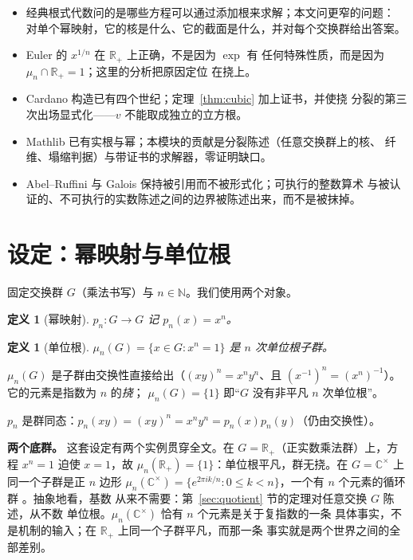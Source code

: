 \documentclass[submission,noinfoline]{jsfds}
\newtheorem{definition}[theorem]{定义}
\begin{document}
\begin{itemize}
\item 经典根式代数问的是哪些方程可以通过添加根来求解；本文问更窄的问题：
对单个幂映射，它的核是什么、它的截面是什么，并对每个交换群给出答案。
\item Euler 的 $x^{1/n}$ 在 $\mathbb R_+$ 上正确，不是因为 $\exp$ 有
任何特殊性质，而是因为 $\mu_n\cap\mathbb R_+=1$；这里的分析把原因定位
在挠上。
\item Cardano 构造已有四个世纪；定理~\ref{thm:cubic} 加上证书，并使挠
分裂的第三次出场显式化——$v$ 不能取成独立的立方根。
\item Mathlib 已有实根与幂；本模块的贡献是分裂陈述（任意交换群上的核、
纤维、塌缩判据）与带证书的求解器，零证明缺口。
\item Abel--Ruffini 与 Galois 保持被引用而不被形式化；可执行的整数算术
与被认证的、不可执行的实数陈述之间的边界被陈述出来，而不是被抹掉。
\end{itemize}

\section{设定：幂映射与单位根}\label{sec:setting}

固定交换群 $G$（乘法书写）与 $n\in\mathbb N$。我们使用两个对象。

\begin{definition}[幂映射]\label{def:power}
$p_n\colon G\to G$ 记 $p_n(x)=x^n$。
\end{definition}
\begin{definition}[单位根]\label{def:mu}
$\mu_n(G)=\{x\in G:x^n=1\}$ 是 $n$ 次单位根子群。
\end{definition}

$\mu_n(G)$ 是子群由交换性直接给出（$(xy)^n=x^ny^n$、且
$(x^{-1})^n=(x^n)^{-1}$）。它的元素是指数为 $n$ 的\emph{挠}；
$\mu_n(G)=\{1\}$ 即``$G$ 没有非平凡 $n$ 次单位根''。

$p_n$ 是群同态：$p_n(xy)=(xy)^n=x^ny^n=p_n(x)p_n(y)$（仍由交换性）。

\textbf{两个底群。} 这套设定有两个实例贯穿全文。在
$G=\mathbb R_+$（正实数乘法群）上，方程 $x^n=1$ 迫使 $x=1$，故
$\mu_n(\mathbb R_+)=\{1\}$：单位根平凡，群无挠。在 $G=\mathbb C^\times$
上同一个子群是正 $n$ 边形 $\mu_n(\mathbb C^\times)=\{e^{2\pi i k/n}:0\le
k<n\}$，一个有 $n$ 个元素的循环群 \citep{Gauss1801}。抽象地看，基数
从来不需要：第~\ref{sec:quotient} 节的定理对任意交换 $G$ 陈述，从不数
单位根。$\mu_n(\mathbb C^\times)$ 恰有 $n$ 个元素是关于复指数的一条
具体事实，不是机制的输入；在 $\mathbb R_+$ 上同一个子群平凡，而那一条
事实就是两个世界之间的全部差别。
\end{document}
